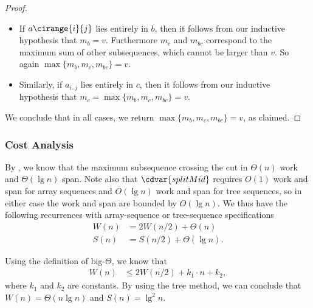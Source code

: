 \begin{flex}
\begin{proof}
\begin{itemize}
\item 
If $a\cirange{i}{j}$ lies entirely in $b$, then it follows from our
inductive hypothesis that $m_b = v$.  Furthermore $m_c$ and $m_{bc}$
correspond to the maximum sum of other subsequences, which cannot be
larger than $v$. 
So again $\max\{m_b, m_c, m_{bc}\} = v$.

\item Similarly, if $a_{i..j}$ lies entirely in $c$, then it follows
  from our inductive hypothesis that $m_c = \max\{m_b, m_c, m_{bc}\} =
  v$.

\end{itemize}

We conclude that in all cases, we return $\max\{m_b, m_c, m_{bc}\} = v$,
as claimed.

\end{proof}
\end{flex}


\subsubsection{Cost Analysis}
\label{sec:mcss::dc::first::cost}

\begin{cluster}
\label{grp:grm:mcss::bestacross}

\begin{gram}
\label{grm:mcss::bestacross}
By , we know that the maximum
subsequence crossing the cut in $\Theta(n)$ work and $\Theta(\lg{n})$
span.
Note also that $\cdvar{splitMid}$ requires $O(1)$ work and span for array sequences 
and $O(\lg n)$ work and span for tree sequences, so in either case the work and span
are bounded by $O(\lg n)$.
We thus have the following recurrences with array-sequence or
tree-sequence specifications
\[ \begin{align*}
  W(n) &= 2W(n/2) + \Theta(n)\\
  S(n) &= S(n/2) +  \Theta(\lg n).
\end{align*} \]

Using the definition of big-$\Theta$, we know
that
\[ \begin{align*}
  W(n) &\leq 2W(n/2) + k_1\cdot n + k_2,
\end{align*} \]
where $k_1$ and $k_2$ are constants.
By using the tree method, we can conclude that $W(n) = \Theta(n\lg{n})$ and
$S(n) = \lg^2{n}$.

\end{gram}
\end{cluster}

